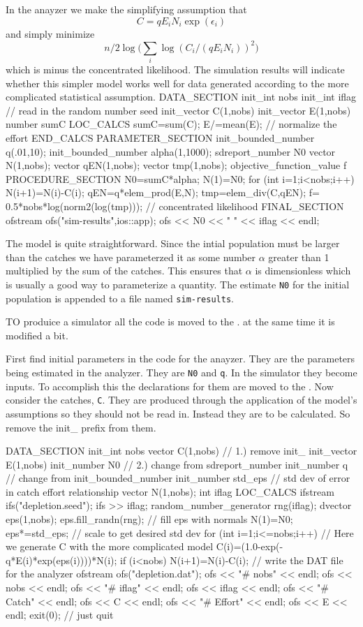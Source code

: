 In the anayzer we make the simplifying assumption that
$$C=qE_iN_i\exp(\epsilon_i)$$
and simply minimize 
$$n/2\log\big(\sum_i \log(C_i/(qE_iN_i))^2\big)$$
which is minus the concentrated likelihood. 
The simulation results will indicate whether this simpler model
works well for data generated according to the more complicated
statistical assumption.
\beginexample
DATA_SECTION
  init_int nobs
  init_int iflag  // read in the random number seed
  init_vector C(1,nobs)
  init_vector E(1,nobs)
  number sumC
 LOC_CALCS
  sumC=sum(C);
  E/=mean(E);   // normalize the effort
 END_CALCS
PARAMETER_SECTION
  init_bounded_number q(.01,10);
  init_bounded_number alpha(1,1000);
  sdreport_number N0
  vector N(1,nobs);
  vector qEN(1,nobs);
  vector tmp(1,nobs);
  objective_function_value f
PROCEDURE_SECTION
  N0=sumC*alpha;
  N(1)=N0;
  for (int i=1;i<nobs;i++)
  {
    N(i+1)=N(i)-C(i);
  }
  qEN=q*elem_prod(E,N);
  tmp=elem_div(C,qEN);
  f= 0.5*nobs*log(norm2(log(tmp))); // concentrated likelihood
FINAL_SECTION
  ofstream ofs("sim-results",ios::app);
  ofs << N0 << "  "  << iflag << endl;
\endexample

The model is quite straightforward. Since the intial population must be
larger than the catches we have parameterzed it as some number $\alpha$
greater than 1
multiplied by the sum of the catches. This ensures that $\alpha$ is dimensionless
which is usually a good way to parameterize a quantity.
The estimate {\tt N0} for the initial population is appended to a
file named {\tt sim-results}. 

TO produice a simulator all the code is moved to the \DS.
at the same time it is modified a bit. 

First find initial parameters
in the code for the anayzer.  They are the parameters being
estimated in the analyzer. They are {\tt N0} and {\tt q}.
In the simulator they become inputs. To accomplish this 
the declarations for them are moved to the \DS. Now consider the catches,
{\tt C}. They are produced through the application of the model's
assumptions so they should not be read in. Instead they are to be 
calculated. So remove the {init\_} prefix from them.

\beginexample
DATA_SECTION
  init_int nobs
  vector C(1,nobs)   // 1.) remove init_
  init_vector E(1,nobs)
  init_number N0     // 2.) change from sdreport_number
  init_number q   // change from init_bounded_number
  init_number std_eps   // std dev of error in catch effort relationship
  vector N(1,nobs);
  int iflag
 LOC_CALCS
  ifstream ifs("depletion.seed");
  ifs >> iflag;
  random_number_generator rng(iflag);
  dvector eps(1,nobs);
  eps.fill_randn(rng); // fill eps with normals
  N(1)=N0;
  eps*=std_eps; // scale to get desired std dev
  for (int i=1;i<=nobs;i++)
  {
    // Here we generate C with the more complicated model
    C(i)=(1.0-exp(-q*E(i)*exp(eps(i))))*N(i);
    if (i<nobs) N(i+1)=N(i)-C(i);
  }
  // write the DAT file for the analyzer
  ofstream ofs("depletion.dat");
  ofs << "# nobs" << endl;
  ofs << nobs << endl;
  ofs << "# iflag" << endl;
  ofs << iflag << endl;
  ofs << "# Catch" << endl;
  ofs << C << endl;
  ofs << "# Effort" << endl;
  ofs << E << endl;
  exit(0);  // just quit

